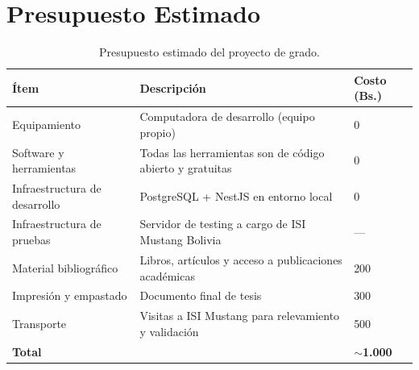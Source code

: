 \documentclass{univalle-perfil}
\begin{document}
\section{Presupuesto Estimado}

\begin{table}[H]
\centering
\caption{Presupuesto estimado del proyecto de grado.}
\begin{tabular}{p{}p{}p{}}
\toprule
\textbf{Ítem} & \textbf{Descripción} & \textbf{Costo (Bs.)} \\
\midrule
Equipamiento & Computadora de desarrollo (equipo propio) & 0 \\
Software y herramientas & Todas las herramientas son de código abierto y gratuitas & 0 \\
Infraestructura de desarrollo & PostgreSQL + NestJS en entorno local & 0 \\
Infraestructura de pruebas & Servidor de testing a cargo de ISI Mustang Bolivia & --- \\
Material bibliográfico & Libros, artículos y acceso a publicaciones académicas & 200 \\
Impresión y empastado & Documento final de tesis & 300 \\
Transporte & Visitas a ISI Mustang para relevamiento y validación & 500 \\
\midrule
\textbf{Total} & & \textbf{$\sim$1.000} \\
\bottomrule
\end{tabular}
\end{table}


\end{document}
